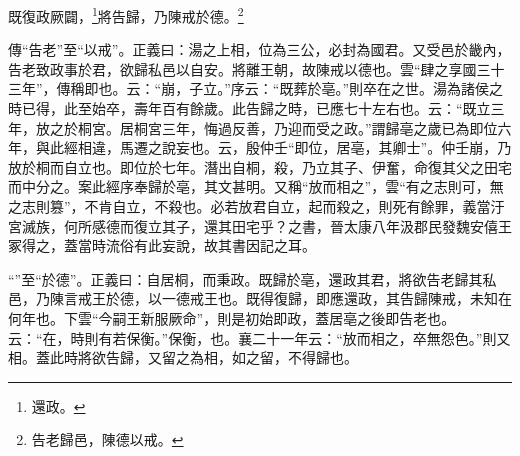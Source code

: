 既復政厥闢，\footnote{還政。}將告歸，乃陳戒於德。\footnote{告老歸邑，陳德以戒。}


{\noindent\zhuan{}\fzbyks 傳“告老”至“以戒”。正義曰：湯之上相，位為三公，必封為國君。又受邑於畿內，告老致政事於君，欲歸私邑以自安。將離王朝，故陳戒以德也。雲“肆之享國三十三年”，傳稱即也。云：“崩，子立。”序云：“既葬於亳。”則卒在之世。湯為諸侯之時已得，此至始卒，壽年百有餘歲。此告歸之時，已應七十左右也。云：“既立三年，放之於桐宮。居桐宮三年，悔過反善，乃迎而受之政。”謂歸亳之歲已為即位六年，與此經相違，馬遷之說妄也。云，殷仲壬“即位，居亳，其卿士”。仲壬崩，乃放於桐而自立也。即位於七年。潛出自桐，殺，乃立其子、伊奮，命復其父之田宅而中分之。案此經序奉歸於亳，其文甚明。又稱“放而相之”，雲“有之志則可，無之志則篡”，不肯自立，不殺也。必若放君自立，起而殺之，則死有餘罪，義當汙宮滅族，何所感德而復立其子，還其田宅乎？之書，晉太康八年汲郡民發魏安僖王冢得之，蓋當時流俗有此妄說，故其書因記之耳。 \par}

{\noindent\shu{}\fzkt “”至“於德”。正義曰：自居桐，而秉政。既歸於亳，還政其君，將欲告老歸其私邑，乃陳言戒王於德，以一德戒王也。既得復歸，即應還政，其告歸陳戒，未知在何年也。下雲“今嗣王新服厥命”，則是初始即政，蓋居亳之後即告老也。云：“在，時則有若保衡。”保衡，也。襄二十一年云：“放而相之，卒無怨色。”則又相。蓋此時將欲告歸，又留之為相，如之留，不得歸也。 \par}

